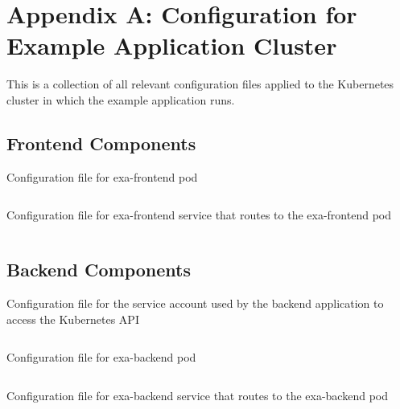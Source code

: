 \chapter*{Appendix A: Configuration for Example Application Cluster} \label{apx:A}

This is a collection of all relevant configuration files applied to the Kubernetes cluster in which the example application runs.

\section*{Frontend Components}

\begin{listing}[H]    
	\caption{Configuration file for exa-frontend pod}    
    \inputminted[autogobble, frame=single, linenos]{yaml}{yaml/exa-frontend/exa-frontend-pod.yaml}
\end{listing}  

\begin{listing}[H]    
	\caption{Configuration file for exa-frontend service that routes to the exa-frontend pod}  
	\inputminted[autogobble, frame=single, linenos]{yaml}{yaml/exa-frontend/exa-frontend-service.yaml}
\end{listing}  


\section*{Backend Components}

\begin{listing}[H]    
	\caption{Configuration file for the service account used by the backend application to access the Kubernetes API}  
	\inputminted[autogobble, frame=single, linenos]{yaml}{yaml/exa-backend/exa-backend-sa.yaml}
	\label{lst:exa-backend-sa}    
\end{listing}  

\begin{listing}[H]    
	\caption{Configuration file for exa-backend pod}  
	\inputminted[autogobble, frame=single, linenos]{yaml}{yaml/exa-backend/exa-backend-pod.yaml}
\end{listing}  

\begin{listing}[H]    
	\caption{Configuration file for exa-backend service that routes to the exa-backend pod} 
	\inputminted[autogobble, frame=single, linenos]{yaml}{yaml/exa-backend/exa-backend-service.yaml}
\end{listing}  

